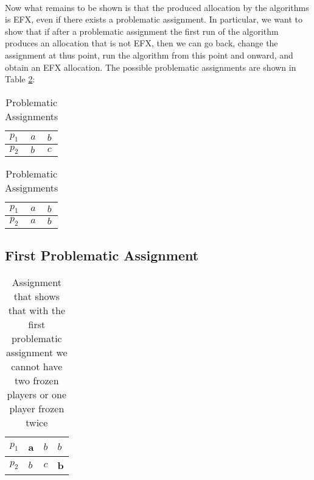 \paragraph{}
Now what remains to  be shown is that the produced allocation by the algorithms is EFX, even if there exists a problematic assignment. In particular, we want to show that if after a problematic assignment the first run of the algorithm produces an allocation that is not EFX, then we can go back, change the assignment at thus point, run the algorithm from this point and onward, and obtain an EFX allocation. 
The possible problematic assignments are shown in Table \ref{table:problematic-assignments-2-players}:
\begin{table}[h]
    \footnotesize
 
        \centering
       \begin{tabular}{|l|l|l|}
            \hline
            $p_1$ & $a$ & $b$ \\ \hline
            $p_2$ & $b$ & $c$ \\ \hline
        \end{tabular}
        \;\;\;\;\;\;\;\;\;\;\;\;
        \centering
        \begin{tabular}{|l|l|l|}
            \hline
            $p_1$ & $a$ & $b$ \\ \hline
            $p_2$ & $a$ & $b$ \\ \hline
        \end{tabular}
        
        \caption{Problematic Assignments}
        \label{table:problematic-assignments-2-players}
    \end{table}
    
\subsection{First Problematic Assignment}
\begin{table}[]
    \centering
    \begin{tabular}{|l|l|l||l|}
    \hline
    $p_1$ & \textbf{a} & $b$ & $b$        \\ \hline
    $p_2$ & $b$        & $c$ & \textbf{b} \\ \hline
    \end{tabular}
    \label{table:first-problem-association-show-no-double-freeze-first}
    \caption{Assignment that shows that with the first problematic assignment we cannot have two frozen players or one player frozen twice}
\end{table}

